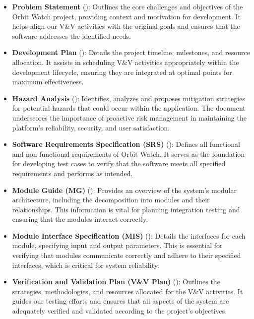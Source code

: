 \documentclass[12pt, titlepage]{article}
\begin{document}
\begin{itemize}
    \item \textbf{Problem Statement} (\cite{Problem_Statement}): Outlines the core challenges and objectives of the Orbit Watch project, providing context and motivation for development. It helps align our V\&V activities with the original goals and ensures that the software addresses the identified needs.

    \item \textbf{Development Plan} (\cite{Development_Plan}): Details the project timeline, milestones, and resource allocation. It assists in scheduling V\&V activities appropriately within the development lifecycle, ensuring they are integrated at optimal points for maximum effectiveness.
    
    \item \textbf{Hazard Analysis} (\cite{Hazard_Analysis}): Identifies, analyzes and proposes mitigation strategies for potential hazards that could occur within the application. The document underscores the importance of proactive risk management in maintaining the platform's reliability, security, and user satisfaction.

    \item \textbf{Software Requirements Specification (SRS)} (\cite{SRS}): Defines all functional and non-functional requirements of Orbit Watch. It serves as the foundation for developing test cases to verify that the software meets all specified requirements and performs as intended.

    \item \textbf{Module Guide (MG)} (\cite{MG}): Provides an overview of the system's modular architecture, including the decomposition into modules and their relationships. This information is vital for planning integration testing and ensuring that the modules interact correctly.

    \item \textbf{Module Interface Specification (MIS)} (\cite{MIS}): Details the interfaces for each module, specifying input and output parameters. This is essential for verifying that modules communicate correctly and adhere to their specified interfaces, which is critical for system reliability.

    \item \textbf{Verification and Validation Plan (V\&V Plan)} (\cite{VnV}): Outlines the strategies, methodologies, and resources allocated for the V\&V activities. It guides our testing efforts and ensures that all aspects of the system are adequately verified and validated according to the project's objectives.
\end{itemize}
\end{document}
